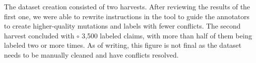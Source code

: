 
The dataset creation consisted of two harvests. 
After reviewing the results of the first one, we were able to rewrite instructions in the tool to guide the annotators to create higher-quality mutations and labels with fewer conflicts.
The second harvest concluded with $\circ$ 3,500 labeled claims, with more than half of them being labeled two or more times. %
As of writing, this figure is not final as the dataset needs to be manually cleaned and have conflicts resolved. 
